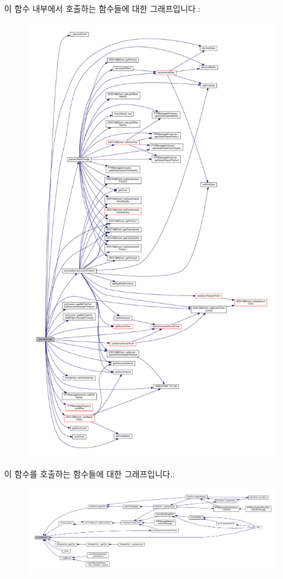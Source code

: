 이 함수 내부에서 호출하는 함수들에 대한 그래프입니다.\+:
\nopagebreak
\begin{figure}[H]
\begin{center}
\leavevmode
\includegraphics[height=550pt]{class_common_port_ac0536467e749cb4bb6b561f562857413_cgraph}
\end{center}
\end{figure}




이 함수를 호출하는 함수들에 대한 그래프입니다.\+:
\nopagebreak
\begin{figure}[H]
\begin{center}
\leavevmode
\includegraphics[width=350pt]{class_common_port_ac0536467e749cb4bb6b561f562857413_icgraph}
\end{center}
\end{figure}


